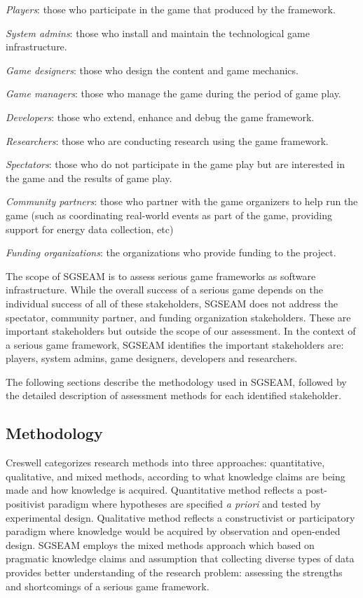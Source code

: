 \documentclass{sigchi}
\begin{document}
\begin{compactitem}
\item \emph{Players}: those who participate in the game that produced by the framework.
\item \emph{System admins}: those who install and maintain the technological game infrastructure.
\item \emph{Game designers}: those who design the content and game mechanics.
 \item \emph{Game managers}: those who manage the game during the period of game play.
\item \emph{Developers}: those who extend, enhance and debug the game framework.
\item \emph{Researchers}: those who are conducting research using the game framework.
\item \emph{Spectators}: those who do not participate in the game
  play but are interested in the game and the results of game play.
\item \emph{Community partners}: those who partner
  with the game organizers to help run the game (such as coordinating real-world events as part
  of the game, providing support for energy data collection, etc)
\item \emph{Funding organizations}: the organizations who provide
  funding to the project.
\end{compactitem}

The scope of SGSEAM is to assess serious game frameworks as software infrastructure. While
the overall success of a serious game depends on the individual success of all of these
stakeholders, SGSEAM does not address the spectator, community partner, and funding
organization stakeholders. These are important stakeholders but outside the scope of our
assessment. In the context of a serious game framework, SGSEAM identifies the important
stakeholders are: players, system admins, game designers, developers and researchers.

The following sections describe the methodology used in SGSEAM, followed by the detailed
description of assessment methods for each identified stakeholder.

\subsection{Methodology}

Creswell \cite{creswell2003} categorizes research methods into three approaches:
quantitative, qualitative, and mixed methods, according to what knowledge claims are being made
and how knowledge is acquired. Quantitative method reflects a post-positivist paradigm where
hypotheses are specified {\em a priori} and tested by experimental design. Qualitative method
reflects a constructivist or participatory paradigm where knowledge would be acquired by
observation and open-ended design. SGSEAM employs the mixed methods approach which based on
pragmatic knowledge claims and assumption that collecting diverse types of data provides better
understanding of the research problem: assessing the strengths and shortcomings of a serious game
framework.
\end{document}
